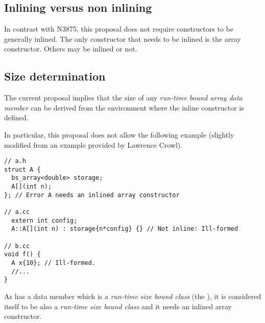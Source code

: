 \subsection{Inlining versus non inlining}

In contrast with N3875, this proposal does not require constructors to be
generally inlined. The only constructor that needs to be inlined is the
array constructor. Others may be inlined or not.

\subsection{Size determination}
\label{sec:inline-size-det}

The current proposal implies that the size of any \emph{run-time bound array
data member} can be derived from the environment where the inline constructor is
defined.

In particular, this proposal does not allow the following example (slightly
modified from an example provided by Lawrence Crowl).

\begin{lstlisting}
// a.h
struct A {
  bs_array<double> storage;
  A[](int n);
}; // Error A needs an inlined array constructor

// a.cc
  extern int config;
  A::A[](int n) : storage{n*config} {} // Not inline: Ill-formed

// b.cc
void f() {
  A x{10}; // Ill-formed.
  //...
}
\end{lstlisting}

As   has a data member which is a \emph{run-time size bound class}
(the ), it is considered itself to be also a \emph{run-time size
bound class} and it needs an inlined array constructor.

